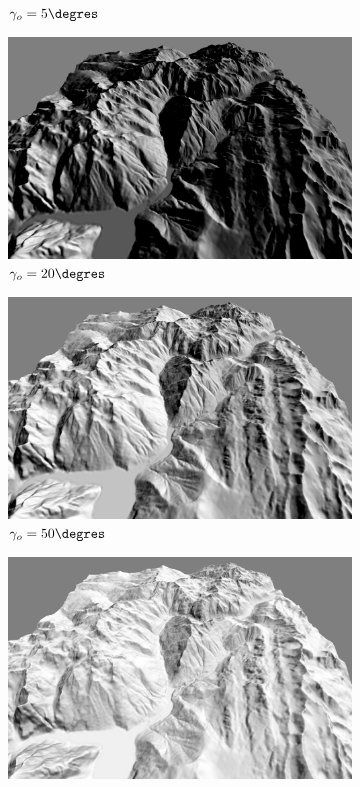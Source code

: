 \begin{figure}[h!]
\begin{subfigure}[t]{0.24\linewidth}
   \caption{$\gamma_o = 5\degres$}
 \end{subfigure}
 \begin{subfigure}[t]{0.24\linewidth}
   \centering
   \includegraphics[width=1.0\linewidth]{Resultats/3_lambert_20.png}
   \caption{$\gamma_o = 20\degres$}
 \end{subfigure}
 \begin{subfigure}[t]{0.24\linewidth}
   \centering
   \includegraphics[width=1.0\linewidth]{Resultats/3_lambert_50.png}
   \caption{$\gamma_o = 50\degres$}
 \end{subfigure}
 \begin{subfigure}[t]{0.24\linewidth}
   \centering
   \includegraphics[width=1.0\linewidth]{Resultats/3_lambert_70.png}

\end{subfigure}
\end{figure}
